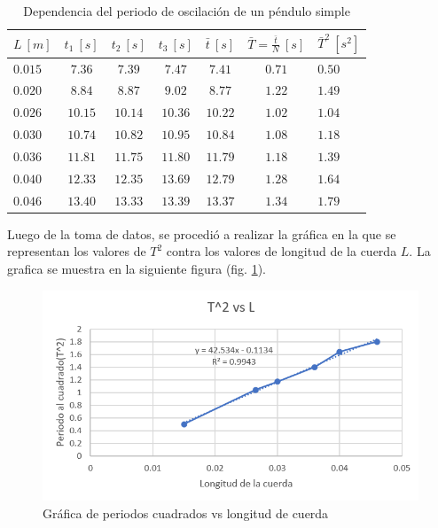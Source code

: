 \documentclass[spanish,notitlepage,letterpaper, 12pt]{article}
\begin{document}
\begin{table}[ht]
    \centering
    \begin{tabular}{l|c|c|c|c|c|l}
        $L \ [m]$ & $t_1 \ [s]$ & $t_2 \ [s]$ & $t_3 \ [s]$ & $\bar{t} \ [s]$ & $\bar{T}=\frac{\bar{t}}{N} \ [s]$ & $\bar{T}^2 \ [s^2]$   \\
        \hline \hline
        $0.015$ & $7.36$ & $7.39$ & $7.47$ & $7.41$ & $0.71$ & $0.50$\\
        $0.020$ & $8.84$ & $8.87$ & $9.02$ & $8.77$ & $1.22$ & $1.49$\\
        $0.026$ & $10.15$ & $10.14$ & $10.36$ & $10.22$ & $1.02$ & $1.04$\\
        $0.030$ & $10.74$ & $10.82$ & $10.95$ & $10.84$ & $1.08$ & $1.18$\\
        $0.036$ & $11.81$ & $11.75$ & $11.80$ & $11.79$ & $1.18$ & $1.39$\\
        $0.040$ & $12.33$ & $12.35$ & $13.69$ & $12.79$ & $1.28$ & $1.64$\\
        $0.046$ & $13.40$ & $13.33$ & $13.39$ & $13.37$ & $1.34$ & $1.79$\\
    \end{tabular}
    \caption{Dependencia del periodo de oscilación de un péndulo simple}
    \label{Table 2}
\end{table}

Luego de la toma de datos, se procedió a realizar la gráfica en la que se representan los valores de $T^2$ contra los valores de longitud de la cuerda $L$. La grafica se muestra en la siguiente figura (fig. \ref{Figura 5}).
\newpage
\begin{figure}[ht]
    \centering
    \includegraphics[width=15.0cm]{images/pc-vs-lc.png}
    \caption{Gráfica de periodos cuadrados vs longitud de cuerda}
    \label{Figura 5}
\end{figure}
\end{document}
